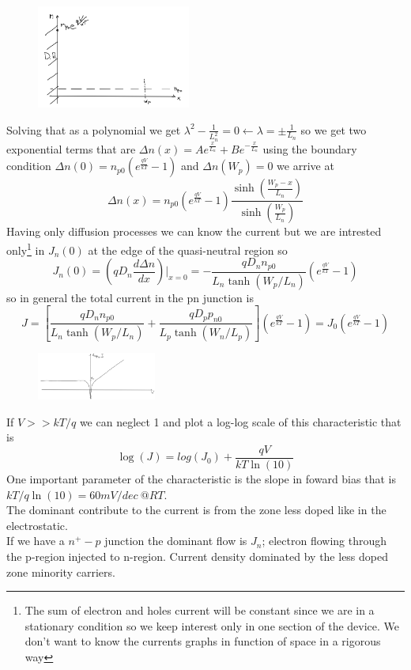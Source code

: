\begin{figure}
\includegraphics[width=0.45\textwidth]{pn10.png}
\end{figure}

Solving that as a polynomial we get $\lambda^2-\frac{1}{L_n^2}=0\leftarrow \lambda=\pm\frac{1}{L_n}$ so we get two exponential terms that are $\Delta n(x)=Ae^{\frac{x}{L_n}}+Be^{-\frac{x}{L_n}}$ using the boundary condition $\Delta n(0)=n_{p0}(e^{\frac{qV}{kT}}-1)$ and $\Delta n(W_p)=0$ we arrive at
\begin{equation}
\Delta n(x)=n_{p0}(e^{\frac{qV}{kT}}-1)\frac{\sinh(\frac{W_p-x}{L_n})}{\sinh(\frac{W_p}{L_n})}
\end{equation}
Having only diffusion processes we can know the current but we are intrested only\footnote{ The sum of electron and holes current will be constant since we are in a stationary condition so we keep interest only in one section of the device. We don't want to know the currents graphs in function of space in a rigorous way} in $J_n(0)$ at the edge of the quasi-neutral region so 
\begin{equation}
J_n(0)=(qD_n \frac{d\Delta n}{dx})|_{x=0}=-\frac{qD_nn_{p0}}{L_n\tanh(W_p/L_n)}(e^{\frac{qV}{kT}}-1)
\end{equation}
so in general the total current in the pn junction is 
\begin{equation}
J=[\frac{qD_nn_{p0}}{L_n\tanh(W_p/L_n)}+\frac{qD_pp_{n0}}{L_p\tanh(W_n/L_p)}](e^{\frac{qV}{kT}}-1)=J_0(e^{\frac{qV}{kT}}-1)
\end{equation}

\begin{figure}
\includegraphics[width=0.35\textwidth]{pn11.png}
\end{figure}


If $V>>kT/q$ we can neglect 1 and plot a log-log scale of this characteristic that is 
\begin{equation}
\log(J)=log(J_0)+\frac{qV}{kT\ln(10)}
\end{equation}
One important parameter of the characteristic is the slope in foward bias that is $kT/q \ln(10)=60mV/dec \ @RT$.\\
\vspace{5mm}
The dominant contribute to the current is from the zone less doped like in the electrostatic.\\
If we have a $n^+-p$ junction the dominant flow is $J_n$; electron flowing through the p-region injected to n-region. Current density dominated by the less doped zone minority carriers.

